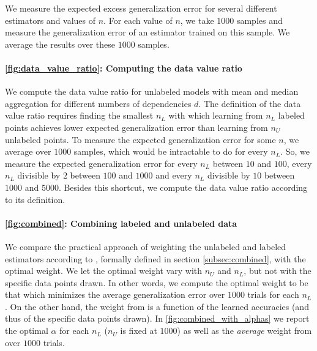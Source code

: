 We measure the expected excess generalization error for several different estimators and values of $n$. For each value of $n$, we take $1000$ samples and measure the generalization error of an estimator trained on this sample. We average the results over these $1000$ samples.

\paragraph{\autoref{fig:data_value_ratio}: Computing the data value ratio}

We compute the data value ratio for unlabeled models with mean and median aggregation for different numbers of dependencies $d$. The definition of the data value ratio requires finding the smallest $n_L$ with which learning from $n_L$ labeled points achieves lower expected generalization error than learning from $n_U$ unlabeled points. To measure the expected generalization error for some $n$, we average over $1000$ samples, which would be intractable to do for every $n_L$. So, we measure the expected generalization error for every $n_L$ between $10$ and $100$, every $n_L$ divisible by $2$ between $100$ and $1000$ and every $n_L$ divisible by $10$ between $1000$ and $5000$. Besides this shortcut, we compute the data value ratio according to its definition.

\paragraph{\autoref{fig:combined}: Combining labeled and unlabeled data}

We compare the practical approach of weighting the unlabeled and labeled estimators according to \cite{GreenStrawderman2001}, formally defined in section \ref{subsec:combined}, with the optimal weight. We let the optimal weight vary with $n_U$ and $n_L$, but not with the specific data points drawn. In other words, we compute the optimal weight to be that which minimizes the average generalization error over $1000$ trials for each $n_L$. On the other hand, the weight from \cite{GreenStrawderman2001} is a function of the learned accuracies (and thus of the specific data points drawn). In \autoref{fig:combined_with_alphas} we report the optimal $\alpha$ for each $n_L$ ($n_U$ is fixed at $1000$) as well as the \textit{average} weight from \cite{GreenStrawderman2001} over $1000$ trials.

